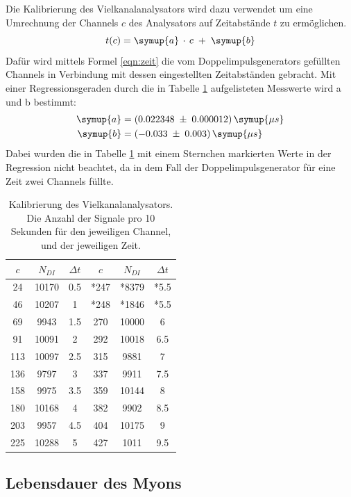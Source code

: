 Die Kalibrierung des Vielkanalanalysators wird dazu verwendet um eine Umrechnung der
Channels $c$ des Analysators auf Zeitabstände $t$ zu ermöglichen.
\begin{equation}
  t(c) = \symup{a}\,\cdot\,c\;+\;\symup{b}
  \label{eqn:zeit}
\end{equation}
Dafür wird mittels Formel \ref{eqn:zeit}
die vom Doppelimpulsgenerators gefüllten Channels in Verbindung mit dessen eingestellten
Zeitabständen gebracht. Mit einer Regressionsgeraden durch die in Tabelle \ref{tab:zeit} aufgelisteten Messwerte wird a und b bestimmt:
\begin{align*}
  \symup{a} &= (0.022348\;\pm\;0.000012)\,\symup{\mu s}\\
  \symup{b} &= (-0.033\;\pm\;0.003)\,\symup{\mu s}\\
\end{align*}
Dabei wurden die in Tabelle \ref{tab:zeit} mit einem Sternchen markierten Werte in der Regression
nicht beachtet, da in dem Fall der Doppelimpulsgenerator für eine Zeit zwei Channels füllte.
\begin{table}
  \centering
  \caption{Kalibrierung des Vielkanalanalysators. Die Anzahl der Signale pro 10 Sekunden für den jeweiligen Channel, und der jeweiligen Zeit.}
  \label{tab:zeit}
  \begin{tabular}{c c c | c c c}
    \toprule
    $c$ & $N_{DI}$ & $\Delta t$ & $c$ & $N_{DI}$ & $\Delta t$\\
    \midrule
    24  & 10170 & 0.5 & *247& *8379 & *5.5\\
    46  & 10207 &  1  & *248& *1846 & *5.5\\
    69  & 9943  & 1.5 & 270 & 10000 &  6\\
    91  & 10091 &  2  & 292 & 10018 & 6.5\\
    113 & 10097 & 2.5 & 315 & 9881  & 7\\
    136 & 9797  &  3  & 337 & 9911  & 7.5\\
    158 & 9975  & 3.5 & 359 & 10144 & 8\\
    180 & 10168 &  4  & 382 & 9902  & 8.5\\
    203 & 9957  & 4.5 & 404 & 10175 & 9\\
    225 & 10288 &  5  & 427 & 1011  & 9.5\\
    \bottomrule
  \end{tabular}
\end{table}

\subsection{Lebensdauer des Myons}
\label{sec:lebensdauer}

